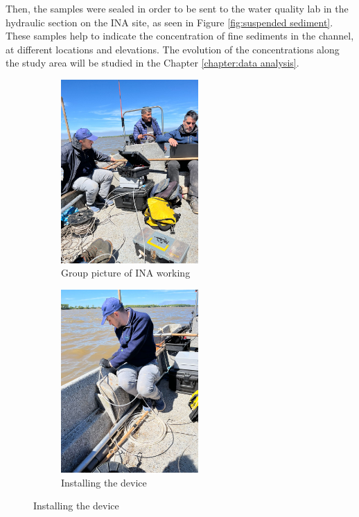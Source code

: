 Then, the samples were sealed in order to be sent to the water quality lab in the hydraulic section on the INA site, as seen in Figure \ref{fig:suspended sediment}. These samples help to indicate the concentration of fine sediments in the channel, at different locations and elevations. The evolution of the concentrations along the study area will be studied in the Chapter \ref{chapter:data analysis}.

\begin{figure}[H]
    \centering
    \begin{subfigure}[b]{0.48\textwidth}
        \includegraphics[width=\linewidth, height=7cm]{figures/ch4/group.jpg}
        \caption{Group picture of INA working}
        \label{fig:first}
    \end{subfigure}
    \hfill
    \begin{subfigure}[b]{0.48\textwidth}
        \includegraphics[width=\linewidth, height=7cm]{figures/ch4/installing.jpg}
        \caption{Installing the device}
        \label{fig:second}
    \end{subfigure}

    \vspace{0.5cm}


\end{figure}
